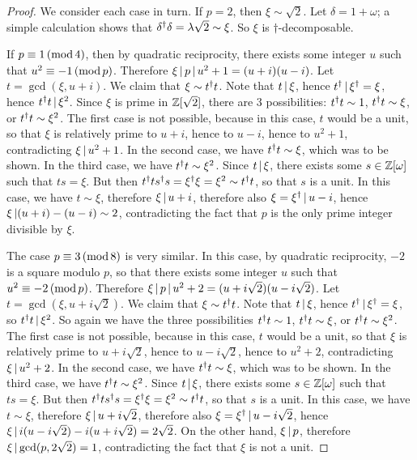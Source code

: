 \begin{proof}
  We consider each case in turn. If $p=2$, then $\xi\sim\sqrt2$. Let
  $\delta=1+\omega$; a simple calculation shows that $\delta^{\dagger}
  \delta=\lambda\sqrt2\sim\xi$. So $\xi$ is $\dagger$-decomposable.

  If $p\equiv 1\,(\mathop{{\rm mod}}4)$, then by quadratic reciprocity, there exists
  some integer $u$ such that $u^2\equiv -1\,(\mathop{{\rm mod}} p)$. Therefore
  $\xi\mathop{|}\nolimits p\mathop{|}\nolimits u^2+1 = (u+i)(u-i)$. Let $t=\gcd(\xi,u+i)$.
  We claim that $\xi\sim t^{\dagger} t$. Note that $t\mathop{|}\nolimits \xi$, hence
  $t^{\dagger}\mathop{|}\nolimits\xi^{\dagger}=\xi$, hence $t^{\dagger} t\mathop{|}\nolimits \xi^2$. Since $\xi$
  is prime in $\mathbb{Z}[\sqrt2]$, there are 3 possibilities: $t^{\dagger} t\sim 1$,
  $t^{\dagger} t\sim \xi$, or $t^{\dagger} t\sim \xi^2$. The first case is not
  possible, because in this case, $t$ would be a unit, so that $\xi$
  is relatively prime to $u+i$, hence to $u-i$, hence to $u^2+1$,
  contradicting $\xi\mathop{|}\nolimits u^2+1$. In the second case, we have $t^{\dagger}
  t\sim \xi$, which was to be shown. In the third case, we have $t^{\dagger}
  t\sim\xi^2$. Since $t\mathop{|}\nolimits \xi$, there exists some
  $s\in\mathbb{Z}[\omega]$ such that $ts=\xi$. But then $t^{\dagger} ts^{\dagger} s =
  \xi^{\dagger}\xi=\xi^2\sim t^{\dagger} t$, so that $s$ is a unit. In this case, we
  have $t\sim \xi$, therefore $\xi\mathop{|}\nolimits u+i$, therefore also
  $\xi=\xi^{\dagger}\mathop{|}\nolimits u-i$, hence $\xi\mathop{|}\nolimits (u+i)-(u-i)\sim 2$,
  contradicting the fact that $p$ is the only prime integer divisible
  by $\xi$.

  The case $p\equiv 3\,(\mathop{{\rm mod}}8)$ is very similar. In this case, by
  quadratic reciprocity, $-2$ is a square modulo $p$, so that there
  exists some integer $u$ such that $u^2\equiv-2\,(\mathop{{\rm mod}} p)$. Therefore
  $\xi\mathop{|}\nolimits p\mathop{|}\nolimits u^2+2 = (u+i\sqrt2)(u-i\sqrt2)$. Let
  $t=\gcd(\xi,u+i\sqrt2)$.  We claim that $\xi\sim t^{\dagger} t$. Note that
  $t\mathop{|}\nolimits\xi$, hence $t^{\dagger}\mathop{|}\nolimits\xi^{\dagger}=\xi$, so $t^{\dagger} t\mathop{|}\nolimits
  \xi^2$. So again we have the three possibilities $t^{\dagger} t\sim 1$,
  $t^{\dagger} t\sim \xi$, or $t^{\dagger} t\sim \xi^2$. The first case is not
  possible, because in this case, $t$ would be a unit, so that $\xi$
  is relatively prime to $u+i\sqrt2$, hence to $u-i\sqrt2$, hence to
  $u^2+2$, contradicting $\xi\mathop{|}\nolimits u^2+2$. In the second case, we
  have $t^{\dagger} t\sim \xi$, which was to be shown. In the third case, we
  have $t^{\dagger} t\sim\xi^2$. Since $t\mathop{|}\nolimits \xi$, there exists some
  $s\in\mathbb{Z}[\omega]$ such that $ts=\xi$. But then $t^{\dagger} ts^{\dagger} s =
  \xi^{\dagger}\xi=\xi^2\sim t^{\dagger} t$, so that $s$ is a unit. In this case, we
  have $t\sim \xi$, therefore $\xi\mathop{|}\nolimits u+i\sqrt2$, therefore also
  $\xi=\xi^{\dagger}\mathop{|}\nolimits u-i\sqrt2$, hence $\xi\mathop{|}\nolimits
  i(u-i\sqrt2)-i(u+i\sqrt2)=2\sqrt2$. On the other hand, $\xi\mathop{|}\nolimits
  p$, therefore $\xi\mathop{|}\nolimits\gcd(p,2\sqrt2)=1$, contradicting the fact
  that $\xi$ is not a unit.


\end{proof}
